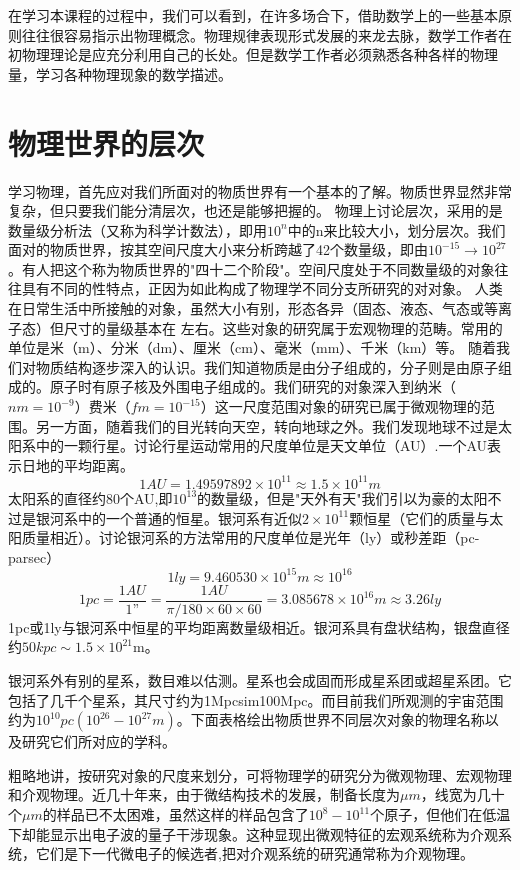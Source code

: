     在学习本课程的过程中，我们可以看到，在许多场合下，借助数学上的一些基本原则往往很容易指示出物理概念。物理规律表现形式发展的来龙去脉，数学工作者在初物理理论是应充分利用自己的长处。但是数学工作者必须熟悉各种各样的物理量，学习各种物理现象的数学描述。
    
    

\section{物理世界的层次}
    学习物理，首先应对我们所面对的物质世界有一个基本的了解。物质世界显然非常复杂，但只要我们能分清层次，也还是能够把握的。  
物理上讨论层次，采用的是数量级分析法（又称为科学计数法），即用$10^n$中的n来比较大小，划分层次。我们面对的物质世界，按其空间尺度大小来分析跨越了42个数量级，即由$10^{-15}\longrightarrow10^{27}$。有人把这个称为物质世界的"四十二个阶段"。空间尺度处于不同数量级的对象往往具有不同的性特点，正因为如此构成了物理学不同分支所研究的对对象。  
人类在日常生活中所接触的对象，虽然大小有别，形态各异（固态、液态、气态或等离子态）但尺寸的量级基本在     左右。这些对象的研究属于宏观物理的范畴。常用的单位是米（m）、分米（dm）、厘米（cm）、毫米（mm）、千米（km）等。  
随着我们对物质结构逐步深入的认识。我们知道物质是由分子组成的，分子则是由原子组成的。原子时有原子核及外围电子组成的。我们研究的对象深入到纳米（$nm=10^{-9}$）费米（$fm=10^{-15}$）这一尺度范围对象的研究已属于微观物理的范围。另一方面，随着我们的目光转向天空，转向地球之外。我们发现地球不过是太阳系中的一颗行星。讨论行星运动常用的尺度单位是天文单位（AU）.一个AU表示日地的平均距离。$$1AU=1.49597892\times10^{11}  \approx1.5\times10^{11}m$$   
太阳系的直径约80个AU,即$10^{13}$的数量级，但是"天外有天"我们引以为豪的太阳不过是银河系中的一个普通的恒星。银河系有近似$2\times10^{11}$颗恒星（它们的质量与太阳质量相近）。讨论银河系的方法常用的尺度单位是光年（ly）或秒差距（pc-parsec）$$1ly=9.460530\times10^{15}m\approx10^{16}$$$$1pc=\frac{1AU}{1”}=\frac{1AU}{\pi/180\times60\times60}=3.085678\times10^{16}m\approx3.26ly$$1pc或1ly与银河系中恒星的平均距离数量级相近。银河系具有盘状结构，银盘直径约$50kpc\sim1.5\times10^{21}$m。
    
         
银河系外有别的星系，数目难以估测。星系也会成固而形成星系团或超星系团。它包括了几千个星系，其尺寸约为1Mpcsim100Mpc。而目前我们所观测的宇宙范围约为$10^{10}pc (10^{26}-10^{27}m)$。下面表格绘出物质世界不同层次对象的物理名称以及研究它们所对应的学科。
         
              粗略地讲，按研究对象的尺度来划分，可将物理学的研究分为微观物理、宏观物理和介观物理。近几十年来，由于微结构技术的发展，制备长度为$\mu m$，线宽为几十个$\mu m$的样品已不太困难，虽然这样的样品包含了$10^8-10^{11}$个原子，但他们在低温下却能显示出电子波的量子干涉现象。这种显现出微观特征的宏观系统称为介观系统，它们是下一代微电子的候选者,把对介观系统的研究通常称为介观物理。
              
